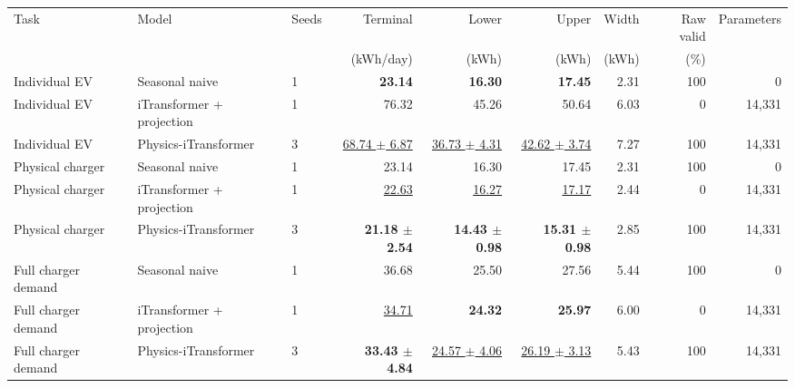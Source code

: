 \begin{tabular}{lllrrrrrr}
\toprule
Task & Model & Seeds & Terminal & Lower & Upper & Width & Raw valid & Parameters \\
 & & & (kWh/day) & (kWh) & (kWh) & (kWh) & (\%) & \\
\midrule
Individual EV & Seasonal naive & 1 & \textbf{23.14} & \textbf{16.30} & \textbf{17.45} & 2.31 & 100 & 0 \\
Individual EV & iTransformer + projection & 1 & 76.32 & 45.26 & 50.64 & 6.03 & 0 & 14,331 \\
Individual EV & Physics-iTransformer & 3 & \underline{68.74 $\pm$ 6.87} & \underline{36.73 $\pm$ 4.31} & \underline{42.62 $\pm$ 3.74} & 7.27 & 100 & 14,331 \\
\addlinespace
Physical charger & Seasonal naive & 1 & 23.14 & 16.30 & 17.45 & 2.31 & 100 & 0 \\
Physical charger & iTransformer + projection & 1 & \underline{22.63} & \underline{16.27} & \underline{17.17} & 2.44 & 0 & 14,331 \\
Physical charger & Physics-iTransformer & 3 & \textbf{21.18 $\pm$ 2.54} & \textbf{14.43 $\pm$ 0.98} & \textbf{15.31 $\pm$ 0.98} & 2.85 & 100 & 14,331 \\
\addlinespace
Full charger demand & Seasonal naive & 1 & 36.68 & 25.50 & 27.56 & 5.44 & 100 & 0 \\
Full charger demand & iTransformer + projection & 1 & \underline{34.71} & \textbf{24.32} & \textbf{25.97} & 6.00 & 0 & 14,331 \\
Full charger demand & Physics-iTransformer & 3 & \textbf{33.43 $\pm$ 4.84} & \underline{24.57 $\pm$ 4.06} & \underline{26.19 $\pm$ 3.13} & 5.43 & 100 & 14,331 \\
\bottomrule
\end{tabular}
